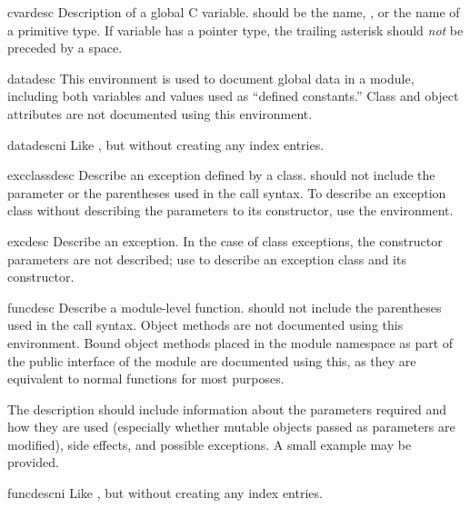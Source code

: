 \documentclass{howto}
\begin{document}
    \begin{envdesc}{cvardesc}{}
      Description of a global C variable.   should be the
       name, , or the name of
      a primitive type.  If variable has a pointer type, the trailing
      asterisk should \emph{not} be preceded by a space.
    \end{envdesc}

    \begin{envdesc}{datadesc}{}
      This environment is used to document global data in a module,
      including both variables and values used as ``defined
      constants.''  Class and object attributes are not documented
      using this environment.
    \end{envdesc}
    \begin{envdesc}{datadescni}{}
      Like , but without creating any index entries.
    \end{envdesc}

    \begin{envdesc}{excclassdesc}{}
      Describe an exception defined by a class.   should not include the  parameter or
      the parentheses used in the call syntax.  To describe an
      exception class without describing the parameters to its
      constructor, use the  environment.
    \end{envdesc}

    \begin{envdesc}{excdesc}{}
      Describe an exception.  In the case of class exceptions, the
      constructor parameters are not described; use 
      to describe an exception class and its constructor.
    \end{envdesc}

    \begin{envdesc}{funcdesc}{}
      Describe a module-level function.   should
      not include the parentheses used in the call syntax.  Object
      methods are not documented using this environment.  Bound object
      methods placed in the module namespace as part of the public
      interface of the module are documented using this, as they are
      equivalent to normal functions for most purposes.

      The description should include information about the parameters
      required and how they are used (especially whether mutable
      objects passed as parameters are modified), side effects, and
      possible exceptions.  A small example may be provided.
    \end{envdesc}
    \begin{envdesc}{funcdescni}{}
      Like , but without creating any index entries.
    \end{envdesc}
\end{document}
